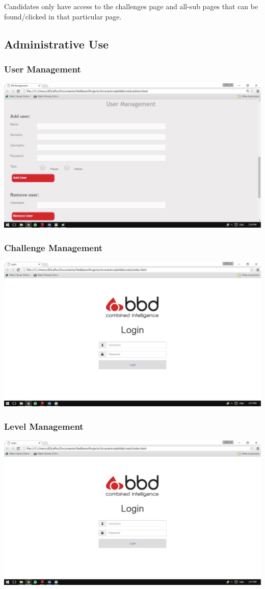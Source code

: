 \documentclass[english]{article}
\begin{document}
	Candidates only have access to the challenges page and all-sub pages that can be found/clicked in that particular page.
	
		\subsection{Administrative Use}
			\subsubsection{User Management}
				\includegraphics[width=\linewidth]{UserManagement.jpg}
			\subsubsection{Challenge Management}
				\includegraphics[width=\linewidth]{Login.jpg}
			\subsubsection{Level Management}
				\includegraphics[width=\linewidth]{Login.jpg}
\end{document}
